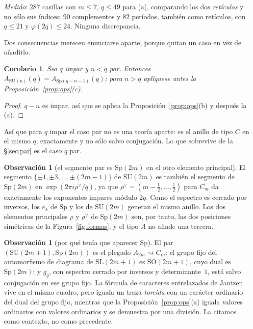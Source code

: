 \documentclass[11pt,a4paper]{article}
\newtheorem{corollary}[theorem]{Corolario}
\theoremstyle{definition}
\newtheorem{remark}[theorem]{Observaci\'on}
\newcommand{\Sp}{\mathrm{Sp}}
\newcommand{\SU}{\mathrm{SU}}
\newcommand{\SO}{\mathrm{SO}}
\newcommand{\SL}{\mathrm{SL}}
\newcommand{\medido}[1]{\emph{Medido}: #1}
\begin{document}
\medido{$287$ casillas con $m\le7$, $q\le49$ para (a), comparando los dos \emph{ret\'iculos} y no
s\'olo sus \'indices; $90$ complementos y $82$ per\'iodos, tambi\'en como ret\'iculos, con $q\le21$
y $\varphi(2q)\le24$. Ninguna discrepancia.}

Dos consecuencias merecen enunciarse aparte, porque quitan un caso en vez de a\~nadirlo.

\begin{corollary}\label{cor:par}
Sea $q$ impar y $n<q$ par. Entonces $A_{\SU(n)}(q)=A_{\Sp(q-n-1)}(q)$; para $n>q$ apl\'iquese
antes la Proposici\'on~\ref{prop:ops}(c).
\end{corollary}

\begin{proof}
$q-n$ es impar, as\'i que se aplica la Proposici\'on~\ref{prop:ops}(b) y despu\'es la (a).
\end{proof}

As\'i que para $q$ impar el caso par no es una teor\'ia aparte: es el anillo de tipo $C$ en el mismo
$q$, exactamente y no s\'olo salvo conjugaci\'on. Lo que sobrevive de la \S\ref{sec:par} es el caso
$q$ par.

\begin{remark}[el segmento par es $\Sp(2m)$ en el otro elemento principal]
El segmento $\{\pm1,\pm3,\dots,\pm(2m-1)\}$ de $\SU(2m)$ es tambi\'en el segmento de $\Sp(2m)$ en
$\exp(2\pi i\rho^\vee/q)$, ya que $\rho^\vee=(m-\tfrac12,\dots,\tfrac12)$ para $C_m$ da exactamente
los exponentes impares m\'odulo $2q$. Como el espectro es cerrado por inversos, los $e_k$ de $\Sp$ y
los de $\SU(2m)$ generan el mismo anillo. Los dos elementos principales $\rho$ y $\rho^\vee$ de
$\Sp(2m)$ son, por tanto, las dos posiciones sim\'etricas de la Figura~\ref{fig:formas}, y el tipo
$A$ no a\~nade una tercera.
\end{remark}

\begin{remark}[por qu\'e ten\'ia que aparecer $\Sp$]
El par $(\SU(2m+1),\Sp(2m))$ es el plegado $A_{2m}\rightsquigarrow C_m$: el grupo fijo del
automorfismo de diagrama de $\SL(2m+1)$ es $\SO(2m+1)$, cuyo dual es $\Sp(2m)$; y $g_q$, con
espectro cerrado por inversos y determinante~$1$, est\'a salvo conjugaci\'on en ese grupo fijo. La
f\'ormula de caracteres entrelazados de Jantzen \cite{Jan,Hopper,FSS} vive en el mismo cuadro, pero
iguala un
traza \emph{torcida} con un car\'acter ordinario del dual del grupo fijo, mientras que la
Proposici\'on~\ref{prop:ops}(a) iguala valores ordinarios con valores ordinarios y se demuestra por
una divisi\'on. La citamos como contexto, no como precedente.
\end{remark}
\end{document}
